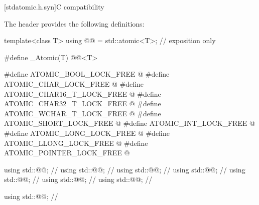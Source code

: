 [stdatomic.h.syn]{C compatibility}

The header  provides the following definitions:

\begin{codeblock}
template<class T>
  using @@ = std::atomic<T>;        // exposition only

#define _Atomic(T) @@<T>

#define ATOMIC_BOOL_LOCK_FREE @\seebelow@
#define ATOMIC_CHAR_LOCK_FREE @\seebelow@
#define ATOMIC_CHAR16_T_LOCK_FREE @\seebelow@
#define ATOMIC_CHAR32_T_LOCK_FREE @\seebelow@
#define ATOMIC_WCHAR_T_LOCK_FREE @\seebelow@
#define ATOMIC_SHORT_LOCK_FREE @\seebelow@
#define ATOMIC_INT_LOCK_FREE @\seebelow@
#define ATOMIC_LONG_LOCK_FREE @\seebelow@
#define ATOMIC_LLONG_LOCK_FREE @\seebelow@
#define ATOMIC_POINTER_LOCK_FREE @\seebelow@

using std::@@;             // \seebelow
using std::@@;     // \seebelow
using std::@@;     // \seebelow
using std::@@;     // \seebelow
using std::@@;     // \seebelow
using std::@@;     // \seebelow
using std::@@;     // \seebelow

using std::@@;              // \seebelow


\end{codeblock}
